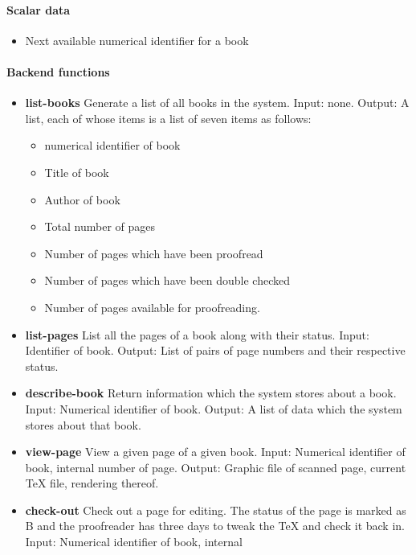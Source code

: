 \begin{itemize}
\begin{itemize}
\paragraph{Scalar data}

\begin{itemize}
\item
  Next available numerical identifier for a book
\end{itemize}

\paragraph{Backend functions}

\begin{itemize}
\item
  {\bf list-books}  Generate a list of all books in the system.  Input:
  none.  Output: A list, each of whose items is a list of seven items
  as follows:
  \begin{itemize}
  \item numerical identifier of book 
  \item Title of
    book 
  \item Author of book 
  \item Total number of pages 
  \item
    Number of pages which have been proofread 
  \item Number of pages
    which have been double checked 
  \item Number of pages available for
    proofreading.
  \end{itemize}
\item
  {\bf list-pages}  List all the pages of a book along with their status. 
  Input: Identifier of book.  Output: List of pairs of page numbers and
  their respective status.
\item
  {\bf describe-book}  Return information which the system stores about a
  book.  Input: Numerical identifier of book.  Output: A list of data
  which the system stores about that book.
\item
  {\bf view-page}  View a given page of a given book.  Input: Numerical
  identifier of book, internal number of page.  Output: Graphic file of
  scanned page, current TeX file, rendering thereof.
\item
  {\bf check-out}  Check out a page for editing. The status of the page is
  marked as B and the proofreader has three days to tweak the TeX and
  check it back in.\\  Input: Numerical identifier of book, internal

\end{itemize}
\end{itemize}
\end{itemize}
